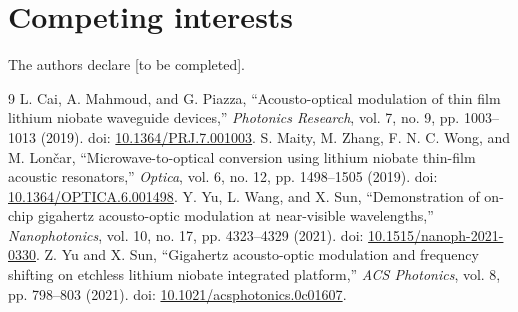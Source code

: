 \documentclass[10pt,twocolumn]{article}
\begin{document}
\section*{Competing interests} The authors declare [to be completed].
\begin{thebibliography}{9}
 L. Cai, A. Mahmoud, and G. Piazza, ``Acousto-optical modulation of thin film lithium niobate waveguide devices,'' \emph{Photonics Research}, vol. 7, no. 9, pp. 1003--1013 (2019). doi: \href{https://doi.org/10.1364/PRJ.7.001003}{10.1364/PRJ.7.001003}.
 S. Maity, M. Zhang, F. N. C. Wong, and M. Lon\v{c}ar, ``Microwave-to-optical conversion using lithium niobate thin-film acoustic resonators,'' \emph{Optica}, vol. 6, no. 12, pp. 1498--1505 (2019). doi: \href{https://doi.org/10.1364/OPTICA.6.001498}{10.1364/OPTICA.6.001498}.
 Y. Yu, L. Wang, and X. Sun, ``Demonstration of on-chip gigahertz acousto-optic modulation at near-visible wavelengths,'' \emph{Nanophotonics}, vol. 10, no. 17, pp. 4323--4329 (2021). doi: \href{https://doi.org/10.1515/nanoph-2021-0330}{10.1515/nanoph-2021-0330}.
 Z. Yu and X. Sun, ``Gigahertz acousto-optic modulation and frequency shifting on etchless lithium niobate integrated platform,'' \emph{ACS Photonics}, vol. 8, pp. 798--803 (2021). doi: \href{https://doi.org/10.1021/acsphotonics.0c01607}{10.1021/acsphotonics.0c01607}.
\end{thebibliography}
\end{document}
